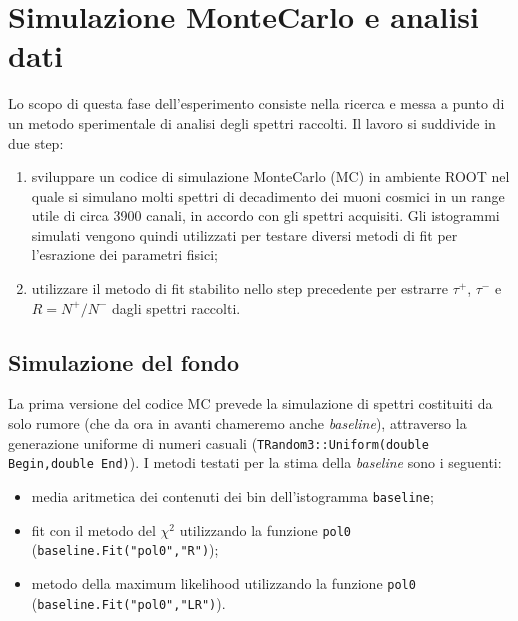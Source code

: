 \section{Simulazione MonteCarlo e analisi dati}

Lo scopo di questa fase dell'esperimento consiste nella ricerca e messa a punto di un
metodo sperimentale di analisi degli spettri raccolti. Il lavoro si suddivide in due step:
\begin{enumerate}
 \item sviluppare un codice di simulazione MonteCarlo (MC) in ambiente ROOT nel quale si simulano molti spettri di decadimento dei muoni cosmici in un range utile di circa 3900 canali, in accordo con gli spettri acquisiti. Gli istogrammi simulati vengono quindi utilizzati per testare diversi metodi di fit per l'esrazione dei parametri fisici;
 \item utilizzare il metodo di fit stabilito nello step precedente per estrarre $\tau^+$, $\tau^-$ e $R=N^+/N^-$ dagli spettri raccolti.
\end{enumerate}
 
\subsection{Simulazione del fondo}
La prima versione del codice MC prevede la simulazione di spettri costituiti da solo rumore (che da ora in avanti chameremo anche \textit{baseline}), attraverso la generazione uniforme di numeri casuali (\lstinline{TRandom3::Uniform(double Begin,double End)}). 
I metodi testati per la stima della \textit{baseline} sono i seguenti:
\begin{itemize}
 \item media aritmetica dei contenuti dei bin dell'istogramma \lstinline{baseline};
 \item fit con il metodo del $\chi^2$ utilizzando la funzione \lstinline{pol0} (\lstinline{baseline.Fit("pol0","R")});
 \item metodo della maximum likelihood utilizzando la funzione \lstinline{pol0} (\lstinline{baseline.Fit("pol0","LR")}).
\end{itemize}

